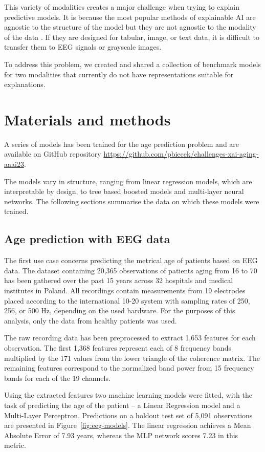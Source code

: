 \documentclass[letterpaper]{article} %
\begin{document}
This variety of modalities creates a major challenge when trying to explain predictive models. It is because the most popular methods of explainable AI are agnostic to the structure of the model but they are not agnostic to the modality of the data \cite{Holzinger2022, ema21}. If they are designed for tabular, image, or text data, it is difficult to transfer them to EEG signals or grayscale images.

To address this problem, we created and shared a collection of benchmark models for two modalities that currently do not have representations suitable for explanations.


\section{Materials and methods}

A series of models has been trained for the age prediction problem and are available on GitHub repository \url{https://github.com/pbiecek/challenges-xai-aging-aaai23}.

The models vary in structure, ranging from linear regression models, which are  interpretable by design, to tree based boosted models and multi-layer neural networks. The following sections summarise the data on which these models were trained.

\subsection{Age prediction with EEG data}

The first use case concerns predicting the metrical age of patients based on EEG data. The dataset containing 20,365 observations of patients aging from 16 to 70 has been gathered over the past 15 years across 32 hospitals and medical institutes in Poland. All recordings contain measurements from 19 electrodes placed according to the international 10-20 system \cite{system10-20} with sampling rates of 250, 256, or 500 Hz, depending on the used hardware. For the purposes of this analysis, only the data from healthy patients was used.

The raw recording data has been preprocessed to extract 1,653 features for each observation. The first 1,368 features represent each of 8 frequency bands multiplied by the 171 values from the lower triangle of the coherence matrix. The remaining features correspond to the normalized band power from 15 frequency bands for each of the 19 channels.

Using the extracted features two machine learning models were fitted, with the task of predicting the age of the patient -- a Linear Regression model and a Multi-Layer Perceptron. Predictions on a holdout test set of 5,091 observations are presented in Figure~\ref{fig:eeg-models}. The linear regression achieves a Mean Absolute Error of 7.93 years, whereas the MLP network scores 7.23 in this metric. %
\end{document}

